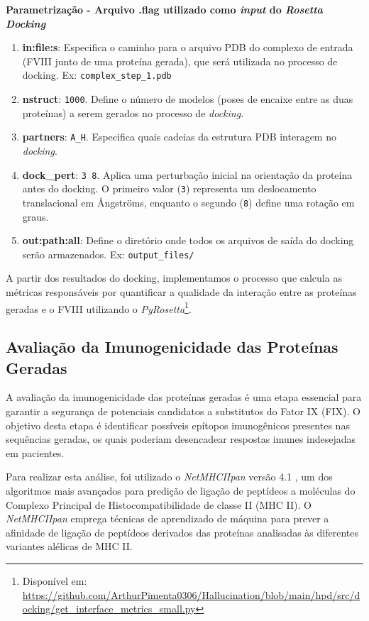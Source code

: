 \textbf{Parametrização - Arquivo .flag utilizado como \textit{input} do \textit{Rosetta Docking}}
\begin{enumerate}
    \item \textbf{in:file:s}: Especifica o caminho para o arquivo PDB do complexo de entrada (FVIII junto de uma proteína gerada), que será utilizada no processo de docking. Ex: \texttt{complex\_step\_1.pdb}
    \item \textbf{nstruct}: \texttt{1000}. Define o número de modelos (poses de encaixe entre as duas proteínas) a serem gerados no processo de \textit{docking}.
    \item \textbf{partners}: \texttt{A\_H}. Especifica quais cadeias da estrutura PDB interagem no \textit{docking}. 
    \item \textbf{dock\_pert}: \texttt{3 8}. Aplica uma perturbação inicial na orientação da proteína antes do docking. O primeiro valor (\texttt{3}) representa um deslocamento translacional em Ångströms, enquanto o segundo (\texttt{8}) define uma rotação em graus.
    \item \textbf{out:path:all}: Define o diretório onde todos os arquivos de saída do docking serão armazenados. Ex: \texttt{output\_files/} 
\end{enumerate}

A partir dos resultados do docking, implementamos
o processo que calcula as métricas responsáveis por quantificar 
a qualidade da interação entre as proteínas geradas e o FVIII utilizando o \textit{PyRosetta}\footnote{Disponível em: \url{https://github.com/ArthurPimenta0306/Hallucination/blob/main/hpd/src/docking/get_interface_metrics_small.py}}. 

\subsection{Avaliação da Imunogenicidade das Proteínas Geradas}

A avaliação da imunogenicidade das proteínas geradas é uma etapa essencial para garantir a segurança de potenciais candidatos a substitutos do Fator IX (FIX). 
O objetivo desta etapa é identificar possíveis epítopos imunogênicos presentes nas sequências geradas, 
os quais poderiam desencadear respostas imunes indesejadas em pacientes.

Para realizar esta análise, foi utilizado o \textit{NetMHCIIpan} versão 4.1 \cite{Jensen2018NetMHCIIpan}, 
um dos algoritmos mais avançados para predição de ligação de peptídeos a moléculas do Complexo Principal de Histocompatibilidade de classe II (MHC II). 
O \textit{NetMHCIIpan} emprega técnicas de aprendizado de máquina para prever a afinidade de ligação de peptídeos 
derivados das proteínas analisadas às diferentes variantes alélicas de MHC II. 

